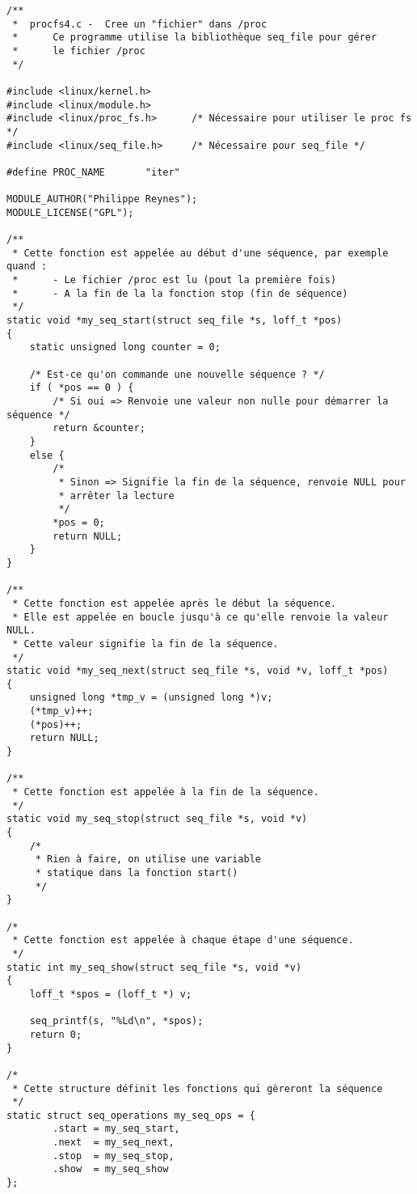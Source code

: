 \documentclass[11pt]{article}
\begin{document}
\begin{verbatim}
/**
 *  procfs4.c -  Cree un "fichier" dans /proc
 *      Ce programme utilise la bibliothèque seq_file pour gérer
 *      le fichier /proc
 */

#include <linux/kernel.h>
#include <linux/module.h>
#include <linux/proc_fs.h>      /* Nécessaire pour utiliser le proc fs */
#include <linux/seq_file.h>     /* Nécessaire pour seq_file */

#define PROC_NAME       "iter"

MODULE_AUTHOR("Philippe Reynes");
MODULE_LICENSE("GPL");

/**
 * Cette fonction est appelée au début d'une séquence, par exemple quand :
 *      - Le fichier /proc est lu (pout la première fois)
 *      - A la fin de la la fonction stop (fin de séquence)
 */
static void *my_seq_start(struct seq_file *s, loff_t *pos)
{
    static unsigned long counter = 0;

    /* Est-ce qu'on commande une nouvelle séquence ? */
    if ( *pos == 0 ) {
        /* Si oui => Renvoie une valeur non nulle pour démarrer la séquence */
        return &counter;
    }
    else {
        /*
         * Sinon => Signifie la fin de la séquence, renvoie NULL pour
         * arrêter la lecture
         */
        *pos = 0;
        return NULL;
    }
}

/**
 * Cette fonction est appelée après le début la séquence.
 * Elle est appelée en boucle jusqu'à ce qu'elle renvoie la valeur NULL.
 * Cette valeur signifie la fin de la séquence.
 */
static void *my_seq_next(struct seq_file *s, void *v, loff_t *pos)
{
    unsigned long *tmp_v = (unsigned long *)v;
    (*tmp_v)++;
    (*pos)++;
    return NULL;
}

/**
 * Cette fonction est appelée à la fin de la séquence.
 */
static void my_seq_stop(struct seq_file *s, void *v)
{
    /*
     * Rien à faire, on utilise une variable
     * statique dans la fonction start()
     */
}

/*
 * Cette fonction est appelée à chaque étape d'une séquence.
 */
static int my_seq_show(struct seq_file *s, void *v)
{
    loff_t *spos = (loff_t *) v;

    seq_printf(s, "%Ld\n", *spos);
    return 0;
}

/*
 * Cette structure définit les fonctions qui gèreront la séquence
 */
static struct seq_operations my_seq_ops = {
        .start = my_seq_start,
        .next  = my_seq_next,
        .stop  = my_seq_stop,
        .show  = my_seq_show
};


\end{verbatim}
\end{document}
